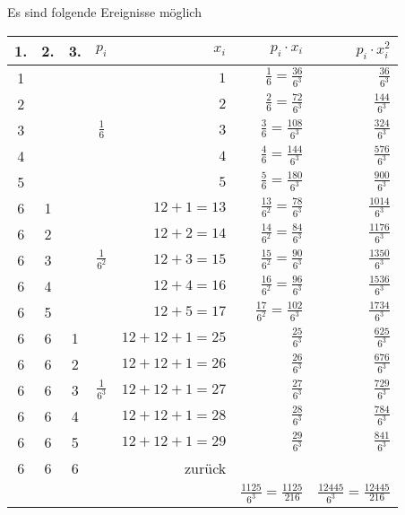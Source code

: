 \begin{loesung}
Es sind folgende Ereignisse möglich
\begin{center}
\begin{tabular}{|ccc|c|r|r|r|}
\hline
1.&2.&3.&$p_i$&$x_i$&$p_i\cdot x_i$&$p_i\cdot x_i^2$\\
\hline
1& & &              &$         1$&$   \frac{1}{6}=\frac{ 36}{6^3}$&$\frac{   36}{6^3}$\\
2& & &              &$         2$&$   \frac{2}{6}=\frac{ 72}{6^3}$&$\frac{  144}{6^3}$\\
3& & &$    \frac16 $&$         3$&$   \frac{3}{6}=\frac{108}{6^3}$&$\frac{  324}{6^3}$\\
4& & &              &$         4$&$   \frac{4}{6}=\frac{144}{6^3}$&$\frac{  576}{6^3}$\\
5& & &              &$         5$&$   \frac{5}{6}=\frac{180}{6^3}$&$\frac{  900}{6^3}$\\
\hline
6&1& &              &$   12+1=13$&$\frac{13}{6^2}=\frac{ 78}{6^3}$&$\frac{ 1014}{6^3}$\\
6&2& &              &$   12+2=14$&$\frac{14}{6^2}=\frac{ 84}{6^3}$&$\frac{ 1176}{6^3}$\\
6&3& &$\frac1{6^2} $&$   12+3=15$&$\frac{15}{6^2}=\frac{ 90}{6^3}$&$\frac{ 1350}{6^3}$\\
6&4& &              &$   12+4=16$&$\frac{16}{6^2}=\frac{ 96}{6^3}$&$\frac{ 1536}{6^3}$\\
6&5& &              &$   12+5=17$&$\frac{17}{6^2}=\frac{102}{6^3}$&$\frac{ 1734}{6^3}$\\
\hline
6&6&1&              &$12+12+1=25$&$               \frac{ 25}{6^3}$&$\frac{  625}{6^3}$\\
6&6&2&              &$12+12+1=26$&$               \frac{ 26}{6^3}$&$\frac{  676}{6^3}$\\
6&6&3&$\frac1{6^3} $&$12+12+1=27$&$               \frac{ 27}{6^3}$&$\frac{  729}{6^3}$\\
6&6&4&              &$12+12+1=28$&$               \frac{ 28}{6^3}$&$\frac{  784}{6^3}$\\
6&6&5&              &$12+12+1=29$&$               \frac{ 29}{6^3}$&$\frac{  841}{6^3}$\\
6&6&6&              &zurück     &                                &                   \\
\hline
 & & &              &            &$\frac{1125}{6^3}=\frac{1125}{216}$
                                                                  &$\frac{12445}{6^3}=\frac{12445}{216}$\\

\end{tabular}
\end{center}
\end{loesung}
